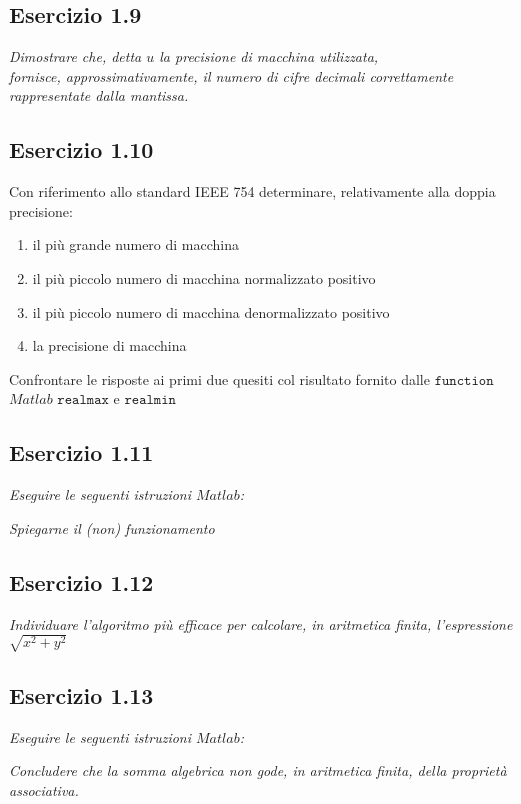 \subsection{Esercizio 1.9}
\emph{Dimostrare che, detta $ u $ la precisione di macchina utilizzata, \\
\flushleft fornisce, approssimativamente, il numero di cifre decimali correttamente rappresentate dalla mantissa.}

\subsection{Esercizio 1.10}
Con riferimento allo standard IEEE 754 determinare, relativamente alla doppia precisione:\\
\begin{enumerate}
  	\item il più grande numero di macchina
  	\item il più piccolo numero di macchina normalizzato positivo
	\item il più piccolo numero di macchina denormalizzato positivo
	\item la precisione di macchina
\end{enumerate}
Confrontare le risposte ai primi due quesiti col risultato fornito dalle $\mathtt{function}$ $Matlab$ $\mathtt{realmax}$ e $\mathtt{realmin}$

\subsection{Esercizio 1.11}
\emph{Eseguire le seguenti istruzioni $Matlab$:}


\emph{Spiegarne il (non) funzionamento}

\subsection{Esercizio 1.12}
\emph{Individuare l'algoritmo più efficace per calcolare, in aritmetica finita, l'espressione $\sqrt{x^{2} + y^{2}}$}

\subsection{Esercizio 1.13}
\emph{Eseguire le seguenti istruzioni $Matlab$:}


\emph{Concludere che la somma algebrica non gode, in aritmetica finita, della proprietà associativa.}


